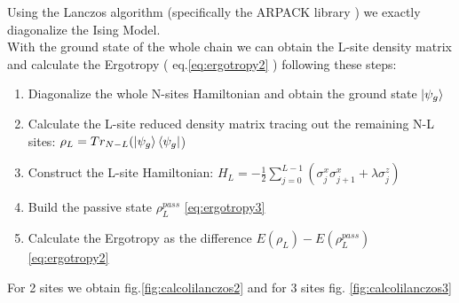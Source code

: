 \documentclass[10pt,a4paper]{article}
\begin{document}
	Using the Lanczos algorithm \cite{Jaegon_2007} (specifically the ARPACK library \cite{arpack})    we exactly diagonalize the Ising Model.\\ With the ground state of the whole chain we can obtain the L-site density matrix and calculate the Ergotropy ( eq.\ref{eq:ergotropy2} ) following these steps:
	\begin{enumerate}
		\item Diagonalize the whole N-sites Hamiltonian and obtain the ground state $\ket{ \psi_g}$
		\item Calculate the L-site reduced density matrix tracing out the remaining N-L sites: $\rho_L=Tr_{N-L}(\ket{ \psi_g}\bra{\psi_g}$) 
		\item Construct the L-site Hamiltonian: 	$H_L=-\frac{1}{2}\sum_{j=0}^{L-1}\left(\sigma_{j}^{x} \sigma_{j+1}^{x}+\lambda\sigma_{j}^{z}\right)$
		\item Build the passive state $\rho^{pass}_L$ \ref{eq:ergotropy3}
		\item Calculate the Ergotropy as the difference $E(\rho_L) - E(\rho^{pass}_L)$ \ref{eq:ergotropy2} 
	\end{enumerate}
	For 2 sites we obtain fig.\ref{fig:calcolilanczos2}  and for 3 sites fig. \ref{fig:calcolilanczos3}
	
	
	
\end{document}
